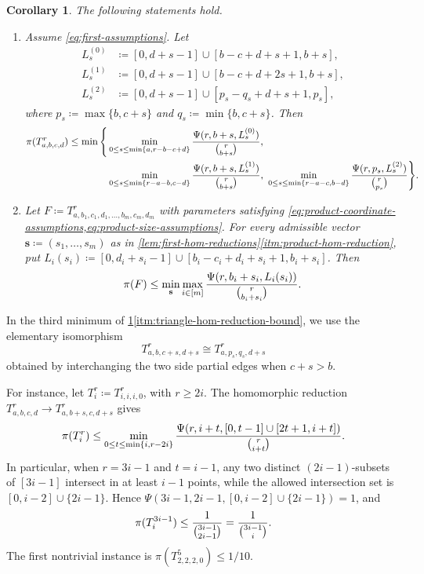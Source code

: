 \documentclass[10pt,a4paper]{article}
\theoremstyle{plain}
\newtheorem{corollary}[corollary]{Corollary}
\theoremstyle{definition}
\theoremstyle{plain}
\begin{document}
\begin{corollary}\label{cor:hom-improved-first}\label{cor:intro-hom-reduction}\label{cor:product-hom-reduction-bound}
The following statements hold.
\begin{enumerate}[label=\textup{(\roman*)},ref=\textup{(\roman*)}]
\item\label{itm:triangle-hom-reduction-bound} Assume \cref{eq:first-assumptions}.  Let 
\begin{align*}
    L_s^{(0)} & \coloneqq[0,d+s-1]\cup[b-c+d+s+1,b+s], \\
    L_s^{(1)} & \coloneqq[0,d+s-1]\cup[b-c+d+2s+1,b+s], \\
    L_s^{(2)} & \coloneqq[0,d+s-1]\cup[p_s-q_s+d+s+1,p_s], 
\end{align*}
where $p_s\coloneqq\max\{b,c+s\}$ and $q_s\coloneqq\min\{b,c+s\}$. 
Then
\[
    \begin{aligned}
        \pi(T^r_{a,b,c,d})
        \le \min\Bigg\{&
        \min_{0 \le s\le\min\{a,r-b-c+d\}}
        \frac{\Psi(r,b+s,L_s^{(0)})}{\tbinom{r}{b+s}},\\
        &
        \min_{0 \le s\le\min\{r-a-b,c-d\}}
        \frac{\Psi(r,b+s,L_s^{(1)})}{\tbinom{r}{b+s}},~
        \min_{0 \le s\le\min\{r-a-c,b-d\}}
        \frac{\Psi(r,p_s,L_s^{(2)})}{\tbinom{r}{p_s}}
        \Bigg\}.
    \end{aligned}
\]
\item\label{itm:product-hom-reduction-bound} Let $F\coloneqq T^r_{a,b_1,c_1,d_1,\ldots,b_m,c_m,d_m}$ with parameters satisfying \cref{eq:product-coordinate-assumptions,eq:product-size-assumptions}.  For every admissible vector $\mathbf s\coloneqq(s_1,\ldots,s_m)$ as in \cref{lem:first-hom-reductions}\ref{itm:product-hom-reduction}, put $L_i(s_i)\coloneqq[0,d_i+s_i-1]\cup[b_i-c_i+d_i+s_i+1,b_i+s_i]$. 
Then
\[
        \pi(F)
        \le
        \min_{\mathbf s}
        \max_{i\in[m]}
        \frac{\Psi(r,b_i+s_i,L_i(s_i))}{\tbinom{r}{b_i+s_i}}.
\]
\end{enumerate}
\end{corollary}

In the third minimum of \cref{cor:hom-improved-first}\ref{itm:triangle-hom-reduction-bound}, we use the elementary isomorphism
\[
        T^r_{a,b,c+s,d+s}\cong T^r_{a,p_s,q_s,d+s}
\]
obtained by interchanging the two side partial edges when $c+s>b$.

For instance, let $T_i^r\coloneqq T^r_{i,i,i,0}$, with $r\ge 2i$.  The homomorphic reduction $T^r_{a,b,c,d}\to T^r_{a,b+s,c,d+s}$ gives
\[
        \pi(T_i^r)
        \le
        \min_{0\le t\le\min\{i,r-2i\}}
        \frac{\Psi(r,i+t,[0,t-1]\cup[2t+1,i+t])}{\tbinom{r}{i+t}}.
\]
In particular, when $r=3i-1$ and $t=i-1$, any two distinct $(2i-1)$-subsets of $[3i-1]$ intersect in at least $i-1$ points, while the allowed intersection set is $[0,i-2]\cup\{2i-1\}$.  Hence $\Psi(3i-1,2i-1,[0,i-2]\cup\{2i-1\})=1$, and
\[
        \pi(T_i^{3i-1})
        \le
        \frac{1}{\tbinom{3i-1}{2i-1}}
        =
        \frac{1}{\tbinom{3i-1}{i}}.
\]
The first nontrivial instance is $\pi(T^5_{2,2,2,0})\le 1/10$.
\end{document}
